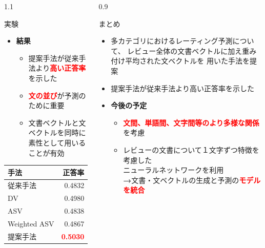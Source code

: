 \documentclass[unicode,10pt]{beamer}
\newlength{\mycolumnwidth}
\newcommand{\arrow}{\textcolor{ttiblue}{\textbf{→}}\hspace{1ex}}
\newcommand{\itemtitle}[1]{\textbf{#1}\\}
\newcommand{\fire}[1]{\textcolor{red}{\textbf{#1}}}
\newcommand{\doublecolumns}[4]{
    \begin{minipage}[t]{#1}
      #2
    \end{minipage}
    \begin{minipage}[t]{#3}
      #4
    \end{minipage}}
\begin{document}
\begin{frame}[t]
\begin{columns}[onlytextwidth,t]
\begin{column}{1.1\mycolumnwidth}
\begin{block}{実験}
      \doublecolumns{0.6\textwidth}{
        \begin{itemize}
          \item \itemtitle{結果}
            \begin{itemize}
              \item 提案手法が従来手法より\fire{高い正答率}を示した
              \item \fire{文の並び}が予測のために重要
              \item 文書ベクトルと文ベクトルを同時に素性として用いることが有効
            \end{itemize}
        \end{itemize}
      }{0.375\textwidth}{
        \begin{table}
          \centering
          \begin{tabular}{l | r}
            手法 & 正答率 \\
            \hline
            従来手法\cite{fujitani15} & 0.4832 \\
            DV & 0.4980 \\
            ASV & 0.4838 \\
            Weighted ASV & 0.4867 \\
            提案手法 & \fire{0.5030} \\
          \end{tabular}
        \end{table}
      }
    \end{block}
  \end{column}

  \begin{column}{0.9\mycolumnwidth}
    \begin{block}{まとめ}
      \begin{itemize}
        \item 多カテゴリにおけるレーティング予測について、
              レビュー全体の文書ベクトルに加え重み付け平均された文ベクトルを
              用いた手法を提案
        \item 提案手法が従来手法\cite{fujitani15}より高い正答率を示した
        \item \itemtitle{今後の予定}
          \begin{itemize}
            \item \fire{文間、単語間、文字間等のより多様な関係}を考慮
            \item レビューの文書について１文字ずつ特徴を考慮した\\
                  ニューラルネットワークを利用 \\
                  \arrow 文書・文ベクトルの生成と予測の\fire{モデルを統合}
          \end{itemize}
      \end{itemize}
    \end{block}


\end{column}
\end{columns}
\end{frame}
\end{document}
